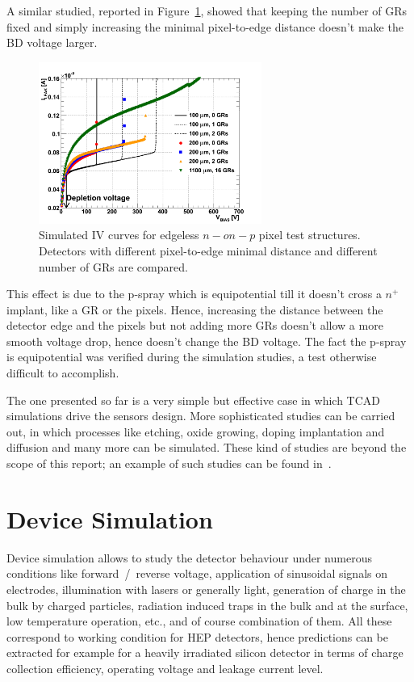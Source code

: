 A similar studied, reported in Figure~\ref{fig:width_GRs}, showed that keeping the number of GRs fixed and simply increasing the 
minimal pixel-to-edge distance doesn't make the BD voltage larger.

\begin{figure}[!htbp]
\centering
\includegraphics[width=0.65\textwidth]{edgeless_BD_FL0_BandW_mix}
\caption{\label{fig:width_GRs}Simulated IV curves for edgeless $n-on-p$ pixel test structures. Detectors with different pixel-to-edge minimal distance 
and different number of GRs are compared.}
\end{figure}

This effect is due to the p-spray which is equipotential till it doesn't cross a $n^+$ implant, like a 
GR or the pixels. Hence, increasing the distance between the detector edge and the pixels but 
not adding more GRs doesn't allow a more smooth voltage drop, hence doesn't change the 
BD voltage. The fact the p-spray is equipotential was verified during the simulation studies, a test 
otherwise difficult to accomplish.


The one presented so far is a very simple but effective case in which TCAD simulations drive the 
sensors design. More sophisticated studies can be carried out, in which processes like 
etching, oxide growing, doping implantation and diffusion and many more can be simulated. 
These kind of studies are beyond the scope of this report; an example of such studies 
can be found in~\cite{CISSIMDET2014}. 

\section{Device Simulation}
\label{sec:sensorsimulation}

Device simulation allows to study the detector behaviour under numerous conditions like 
forward~/~reverse voltage, application of sinusoidal signals on electrodes, illumination with lasers or 
generally light, generation of charge in the 
bulk by charged particles, radiation induced traps in the bulk and at the surface, low temperature 
operation, etc., 
and of course combination of them.
All these correspond to working condition for HEP detectors, hence predictions can be extracted 
for example for a heavily irradiated silicon detector in terms of charge collection efficiency, operating 
voltage and leakage current level.

